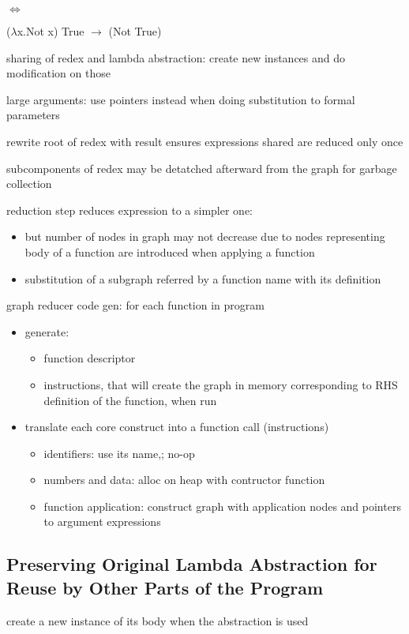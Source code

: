 \documentclass[8pt]{extarticle}
\begin{document}
\begin{multicols*}{2}
$\iff$

($\lambda$x.Not x) True $\rightarrow$ (Not True)

sharing of redex and lambda abstraction: create new instances and do modification on those

large arguments: use pointers instead when doing substitution to formal parameters

rewrite root of redex with result ensures expressions shared are reduced only once

subcomponents of redex may be detatched afterward from the graph for garbage collection

reduction step reduces expression to a simpler one:
\begin{itemize}
\item but number of nodes in graph may not decrease due to nodes representing body of a function are introduced when applying a function
\item substitution of a subgraph referred by a function name with its definition
\end{itemize}

graph reducer code gen:
for each function in program
\begin{itemize}
  \item generate:
    \begin{itemize}
    \item function descriptor
    \item instructions, that will create the graph in memory corresponding to RHS definition of the function, when run
    \end{itemize}
  \item translate each core construct into a function call (instructions)
    \begin{itemize}
      \item identifiers: use its name,; no-op
      \item numbers and data: alloc on heap with contructor function
      \item function application: construct graph with application nodes and pointers to argument expressions
  \end{itemize}
\end{itemize}
  

\subsection{Preserving Original Lambda Abstraction for Reuse by Other Parts of the Program}
create a new instance of its body when the abstraction is used


\end{multicols*}
\end{document}
